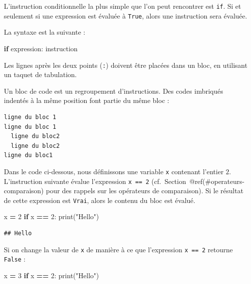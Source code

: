 \documentclass[12pt,]{book}
\newenvironment{Shaded}{\begin{snugshade}}{\end{snugshade}}
\newcommand{\DecValTok}[1]{\textcolor[rgb]{0.00,0.00,0.81}{#1}}
\newcommand{\StringTok}[1]{\textcolor[rgb]{0.31,0.60,0.02}{#1}}
\newcommand{\ControlFlowTok}[1]{\textcolor[rgb]{0.13,0.29,0.53}{\textbf{#1}}}
\newcommand{\OperatorTok}[1]{\textcolor[rgb]{0.81,0.36,0.00}{\textbf{#1}}}
\newcommand{\BuiltInTok}[1]{#1}
\newcommand{\NormalTok}[1]{#1}
\numberwithin{equation}{section}
\numberwithin{countremarque}{section}
\let\BeginKnitrBlock\begin \let\EndKnitrBlock\end
\begin{document}
L'instruction conditionnelle la plus simple que l'on peut rencontrer est
\texttt{if}. Si et seulement si une expression est évaluée à
\texttt{True}, alors une instruction sera évaluée.

La syntaxe est la suivante :

\begin{Shaded}
\begin{Highlighting}[]
\ControlFlowTok{if}\NormalTok{ expression:}
\NormalTok{  instruction}
\end{Highlighting}
\end{Shaded}

Les lignes après les deux points (\texttt{:}) doivent être placées dans
un bloc, en utilisant un taquet de tabulation.

\BeginKnitrBlock{remarque}
Un bloc de code est un regroupement d'instructions. Des codes imbriqués
indentés à la même position font partie du même bloc :

\begin{lstlisting}
ligne du bloc 1
ligne du bloc 1
  ligne du bloc2
  ligne du bloc2
ligne du bloc1
\end{lstlisting}
\EndKnitrBlock{remarque}

Dans le code ci-dessous, nous définissons une variable \texttt{x}
contenant l'entier \(2\). L'instruction suivante évalue l'expression
\texttt{x\ ==\ 2} (cf.~Section~@ref(\#operateurs-comparaison) pour des
rappels sur les opérateurs de comparaison). Si le résultat de cette
expression est \texttt{Vrai}, alors le contenu du bloc est évalué.

\begin{Shaded}
\begin{Highlighting}[]
\NormalTok{x }\OperatorTok{=} \DecValTok{2}
\ControlFlowTok{if}\NormalTok{ x }\OperatorTok{==} \DecValTok{2}\NormalTok{:}
  \BuiltInTok{print}\NormalTok{(}\StringTok{"Hello"}\NormalTok{)}
\end{Highlighting}
\end{Shaded}

\begin{lstlisting}
## Hello
\end{lstlisting}

Si on change la valeur de \texttt{x} de manière à ce que l'expression
\texttt{x\ ==\ 2} retourne \texttt{False} :

\begin{Shaded}
\begin{Highlighting}[]
\NormalTok{x }\OperatorTok{=} \DecValTok{3}
\ControlFlowTok{if}\NormalTok{ x }\OperatorTok{==} \DecValTok{2}\NormalTok{:}
  \BuiltInTok{print}\NormalTok{(}\StringTok{"Hello"}\NormalTok{)}
\end{Highlighting}
\end{Shaded}
\end{document}
